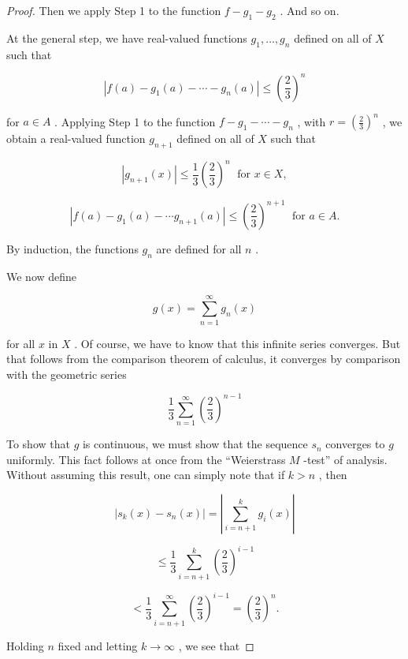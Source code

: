 \begin{proof}
Then we apply Step 1 to the function \(f - {g}_{1} - {g}_{2}\) . And so on.

At the general step, we have real-valued functions \({g}_{1},\ldots ,{g}_{n}\) defined on all of \(X\) such that

\[
\left| {f\left( a\right)  - {g}_{1}\left( a\right)  - \cdots  - {g}_{n}\left( a\right) }\right|  \leq  {\left( \frac{2}{3}\right) }^{n}
\]

for \(a \in  A\) . Applying Step 1 to the function \(f - {g}_{1} - \cdots  - {g}_{n}\) , with \(r = {\left( \frac{2}{3}\right) }^{n}\) , we obtain a real-valued function \({g}_{n + 1}\) defined on all of \(X\) such that

\[
\left| {{g}_{n + 1}\left( x\right) }\right|  \leq  \frac{1}{3}{\left( \frac{2}{3}\right) }^{n}\;\text{ for }x \in  X,
\]

\[
\left| {f\left( a\right)  - {g}_{1}\left( a\right)  - \cdots {g}_{n + 1}\left( a\right) }\right|  \leq  {\left( \frac{2}{3}\right) }^{n + 1}\;\text{ for }a \in  A.
\]

By induction, the functions \({g}_{n}\) are defined for all \(n\) .

We now define

\[
g\left( x\right)  = \mathop{\sum }\limits_{{n = 1}}^{\infty }{g}_{n}\left( x\right)
\]

for all \(x\) in \(X\) . Of course, we have to know that this infinite series converges. But that follows from the comparison theorem of calculus, it converges by comparison with the geometric series

\[
\frac{1}{3}\mathop{\sum }\limits_{{n = 1}}^{\infty }{\left( \frac{2}{3}\right) }^{n - 1}
\]

To show that \(g\) is continuous, we must show that the sequence \({s}_{n}\) converges to \(g\) uniformly. This fact follows at once from the ``Weierstrass \(M\) -test'' of analysis. Without assuming this result, one can simply note that if \(k > n\) , then

\[
\left| {{s}_{k}\left( x\right)  - {s}_{n}\left( x\right) }\right|  = \left| {\mathop{\sum }\limits_{{i = n + 1}}^{k}{g}_{i}\left( x\right) }\right|
\]

\[
\leq  \frac{1}{3}\mathop{\sum }\limits_{{i = n + 1}}^{k}{\left( \frac{2}{3}\right) }^{i - 1}
\]

\[
< \frac{1}{3}\mathop{\sum }\limits_{{i = n + 1}}^{\infty }{\left( \frac{2}{3}\right) }^{i - 1} = {\left( \frac{2}{3}\right) }^{n}.
\]

Holding \(n\) fixed and letting \(k \rightarrow  \infty\) , we see that


\end{proof}
